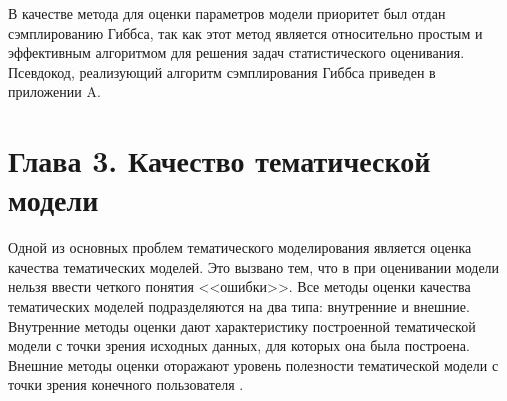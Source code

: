 \documentclass[a4paper]{report}
\begin{document}
	В качестве метода для оценки параметров модели приоритет был отдан сэмплированию Гиббса,  так как этот метод является относительно простым и эффективным алгоритмом для решения задач статистического оценивания. Псевдокод, реализующий алгоритм сэмплирования Гиббса приведен в приложении A.
	


	
	
	
	
	
	
	
	\newpage
	\section{Глава 3. Качество тематической модели}
	
	Одной из основных проблем тематического моделирования является оценка качества тематических моделей. 
	Это вызвано тем, что в при оценивании модели нельзя ввести четкого понятия <<ошибки>>.
	Все методы оценки качества тематических моделей подразделяются на два типа: внутренние и внешние. Внутренние методы оценки дают характеристику построенной тематической модели с точки зрения исходных данных, для которых она была построена. 
	Внешние методы оценки оторажают уровень полезности тематической модели с точки зрения конечного пользователя \cite{bib:Voron1}.
	
\end{document}
